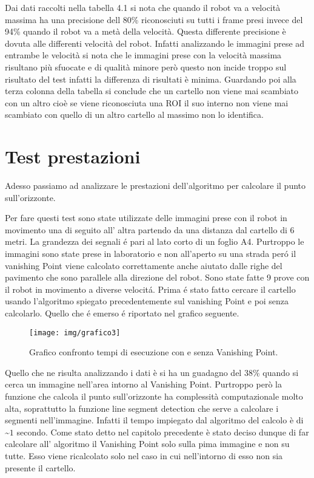 	Dai dati raccolti nella tabella 4.1 si nota che quando il robot va a velocità massima ha una precisione dell 80\% riconosciuti su tutti i frame presi invece del 94\% quando il robot va a metà della velocità. Questa differente precisione è dovuta alle differenti velocità del robot. Infatti analizzando le immagini prese ad entrambe le velocità si nota che le immagini prese con la velocità massima risultano più sfuocate e di qualità minore però questo non incide troppo sul risultato del test infatti la differenza di risultati è minima. Guardando poi alla terza colonna della tabella si conclude che un cartello non viene mai scambiato con un altro cioè se viene riconosciuta una ROI il suo interno non viene mai scambiato con quello di un altro cartello al massimo non lo identifica.

\section{Test prestazioni}

	Adesso passiamo ad analizzare le prestazioni dell'algoritmo per calcolare il punto sull'orizzonte.

	Per fare questi test sono state utilizzate delle immagini prese con il robot in movimento una di seguito all' altra partendo da una distanza dal cartello di 6 metri. La grandezza dei segnali \'e pari al lato corto di un foglio A4. Purtroppo le immagini sono state prese in laboratorio e non all'aperto su una strada per\'o il vanishing Point viene calcolato correttamente anche aiutato dalle righe del pavimento che sono parallele alla direzione del robot. Sono state fatte 9 prove con il robot in movimento a diverse velocit\'a. Prima \'e stato fatto cercare il cartello usando l'algoritmo spiegato precedentemente sul vanishing Point e poi senza calcolarlo. Quello che \'e emerso \'e riportato nel grafico seguente.

	\begin{figure}[!ht]
		\centering
		\texttt{[image: img/grafico3]}
		\caption{Grafico confronto tempi di esecuzione con e senza Vanishing Point.}
	\end{figure}

	Quello che ne risulta analizzando i dati è si ha un guadagno del 38\% quando si cerca un immagine nell'area intorno al Vanishing Point. Purtroppo però la funzione che calcola il punto sull'orizzonte ha complessità computazionale molto alta, soprattutto la funzione line segment detection che serve a calcolare i segmenti nell'immagine. Infatti il tempo impiegato dal algoritmo del calcolo è di \textasciitilde $1$ secondo. Come stato detto nel capitolo precedente è stato deciso dunque di far calcolare all' algoritmo il Vanishing Point solo sulla pima immagine e non su tutte. Esso viene ricalcolato solo nel caso in cui nell'intorno di esso non sia presente il cartello.

